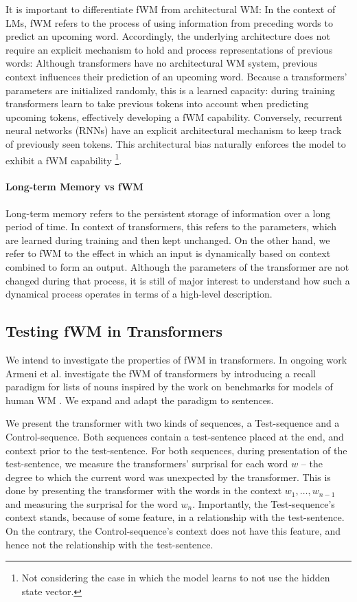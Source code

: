 It is important to differentiate fWM from architectural WM: In the context of LMs, fWM refers to the process of using information from preceding words to predict an upcoming word.
Accordingly, the underlying architecture does not require an explicit mechanism to hold and process representations of previous words:
Although transformers have no architectural WM system, previous context influences their prediction of an upcoming word.
Because a transformers' parameters are initialized randomly, this is a learned capacity: during training transformers learn to take previous tokens into account when predicting upcoming tokens, effectively developing a fWM capability.
Conversely, recurrent neural networks (RNNs) \parencite{elman_finding_1990, mikolov_recurrent_2010} have an explicit architectural mechanism to keep track of previously seen tokens. This architectural bias naturally enforces the model to exhibit a fWM capability
\footnote{Not considering the case in which the model learns to not use the hidden state vector.}.

\paragraph{Long-term Memory vs fWM} Long-term memory refers to the persistent storage of information over a long period of time.
In context of transformers, this refers to the parameters, which are learned during training and then kept unchanged.
On the other hand, we refer to fWM to the effect in which an input is dynamically based on context combined to form an output.
Although the parameters of the transformer are not changed during that process, it is still of major interest to understand how such a dynamical process operates in terms of a high-level description.


\subsection{Testing fWM in Transformers}

We intend to investigate the properties of fWM in transformers.
In ongoing work Armeni et al. investigate the fWM of transformers by introducing a recall paradigm for lists of nouns inspired by the work on benchmarks for models of human WM \parencite{oberauer_benchmarks_2018}.
We expand and adapt the paradigm to sentences.

We present the transformer with two kinds of sequences, a Test-sequence and a Control-sequence.
Both sequences contain a test-sentence placed at the end, and context prior to the test-sentence.
For both sequences, during presentation of the test-sentence, we measure the transformers' surprisal for each word $w$ -- the degree to which the current word was unexpected by the transformer.
This is done by presenting the transformer with the words in the context $w_1 , \dots , w_{n-1}$ and measuring the surprisal for the word $w_n$.
Importantly, the Test-sequence's context stands, because of some feature, in a relationship with the test-sentence.
On the contrary, the Control-sequence's context does not have this feature, and hence not the relationship with the test-sentence.

